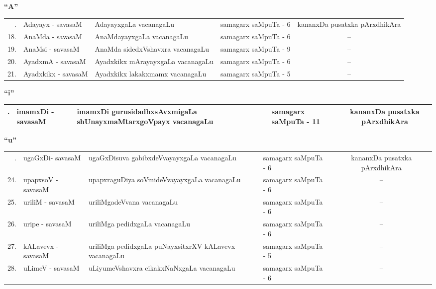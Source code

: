 \centerline{\bf ``A''}

{\renewcommand{\arraystretch}{1.3}
\begin{longtable}{rl>{\raggedright}p{5.5cm}lc}
\hline
\endfirsthead
\hline
\endhead
\hline
\endfoot
\endlastfoot
17. & Adayayx - savasaM & AdayayxgaLa vacanagaLu & samagarx saMpuTa - 6 & kananxDa pusatxka pArxdhikAra\\
18. & AnaMda - savasaM & AnaMdayayxgaLa vacanagaLu & samagarx saMpuTa - 6 & --\\
19. & AnaMsi - savasaM & AnaMda sidedxVshavxra vacanagaLu & samagarx saMpuTa - 9 & --\\
20. & AyadxmA - savasaM & Ayadxkikx mArayayxgaLa vacanagaLu & samagarx saMpuTa - 6 & --\\
21. & Ayadxkikx - savasaM & Ayadxkikx lakakxmamx vacanagaLu & samagarx saMpuTa - 5 & --\\
\hline
\end{longtable}}

\centerline{\bf ``i''}

{\renewcommand{\arraystretch}{1.3}
\begin{longtable}{rl>{\raggedright}p{5.5cm}lc}
\hline
\endfirsthead
\hline
\endhead
\hline
\endfoot
\endlastfoot
22. & imamxDi - savasaM & imamxDi gurusidadhxsAvxmigaLa shUnayxmaMtarxgoVpayx vacanagaLu & samagarx saMpuTa - 11 & kananxDa pusatxka pArxdhikAra\\
\hline
\end{longtable}}



\centerline{\bf ``u''}

{\renewcommand{\arraystretch}{1.3}
\begin{longtable}{rl>{\raggedright}p{5.5cm}lc}
\hline
\endfirsthead
\hline
\endhead
\hline
\endfoot
\endlastfoot
23. &  ugaGxDi- savasaM & ugaGxDisuva gabibxdeVvayayxgaLa vacanagaLu & samagarx saMpuTa - 6  & kananxDa pusatxka pArxdhikAra\\
24. &  upapxsoV - savasaM & upapxraguDiya soVmideVvayayxgaLa vacanagaLu & samagarx saMpuTa - 6 & --\\
25. &  uriliM - savasaM & uriliMgadeVvana vacanagaLu & samagarx saMpuTa - 6 & --\\
26. &  uripe - savasaM & uriliMga pedidxgaLa vacanagaLu & samagarx saMpuTa - 6 & --\\
27. &  kALavevx - savasaM & uriliMga pedidxgaLa puNayxsitxrXV kALavevx vacanagaLu & samagarx saMpuTa - 5 & --\\
28. &  uLimeV - savasaM & uLiyumeVshavxra cikakxNaNxgaLa vacanagaLu & samagarx saMpuTa - 6  & --\\
\hline
\end{longtable}}

